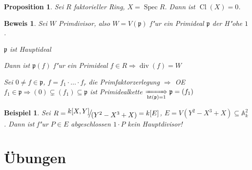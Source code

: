 \documentclass[paper = A4, fontsize=12pt, numbers=noendperiod, chapterprefix=true]{scrbook}
\renewcommand{\thesection}{\arabic{section}}
\renewcommand*{\othersectionlevelsformat}[3]{\ifstr{#1}{section}{\S\ #3\autodot}{#3\autodot}\enskip}
\renewcommand*{\sectionmarkformat}{\S \thesection\autodot\enskip}
\theoremstyle{break}
\newtheorem{Prop}[Def]{Proposition}
\theoremstyle{nonumberbreak}
\newtheorem{bsp}{Beispiel}
\newtheorem{bew}{Beweis}
\theoremstyle{nonumberplain}
\DeclareMathOperator{\Spec}{Spec}
\DeclareMathOperator{\Cl}{Cl}
\DeclareMathOperator{\Ht}{ht}
\DeclareMathOperator{\ddiv}{div}
\newcommand{\A}{\mathbb{A}}
\newcommand{\p}{\mathfrak{p}} %
\newcommand{\FakRaum}[2]{
  \raisebox{0.7ex}{\ensuremath{#1}}
  \ensuremath{\mkern-3mu}\big/\ensuremath{\mkern-3mu}
  \raisebox{-0.6ex}{\ensuremath{#2}}}
\renewcommand{\OE}{O\!\!E~}
\begin{document}
\begin{Prop}
Sei $R$ faktorieller Ring, $X = \Spec R$. Dann ist $\Cl(X) = 0$.
\end{Prop}

\begin{bew}
Sei $W$ Primdivisor, also $W = V(\p)$ f"ur ein Primideal $\p$ der H"ohe $1$.

\begin{description}[\setlabelstyle{\bfseries}]
	\item[Behauptung:]$\p$ ist Hauptideal
\end{description}

Dann ist $\p(f)$ f"ur ein Primideal $f \in R \Rightarrow \ddiv(f) = W$

\begin{description}[\setlabelstyle{\itshape}]
	\item[Beweis der Behauptung:]Sei $0 \ne f \in \p$, $f = f_1 \cdot \ldots \cdot f_r$ die Primfaktorzerlegung $\Rightarrow$ \OE $f_1 \in \p \Rightarrow (0) \subsetneq (f_1) \subseteq \p$ ist Primidealkette $\xRightarrow[\Ht(\p) = 1]{} \p = (f_1)$
\end{description}\end{bew}

\begin{bsp}
Sei $R = \FakRaum{k[X,Y]}{(Y^2-X^3+X)} = k[E]$, $E = V(Y^2-X^3+X) \subseteq \A_k^2$. Dann ist f"ur $P \in E$ abgeschlossen $1 \cdot P$ kein Hauptdivisor!
\end{bsp}





\appendix


\chapter{\"Ubungen}

\renewcommand*{\othersectionlevelsformat}[3]{\ifstr{#1}{section}{\"Ubung\ #3\ vom\ }{#3\autodot\enskip}}

\renewcommand*{\sectionmarkformat}{\"Ubung \thesection\autodot\ vom\enskip}

\setcounter{section}{-1}
\end{document}

